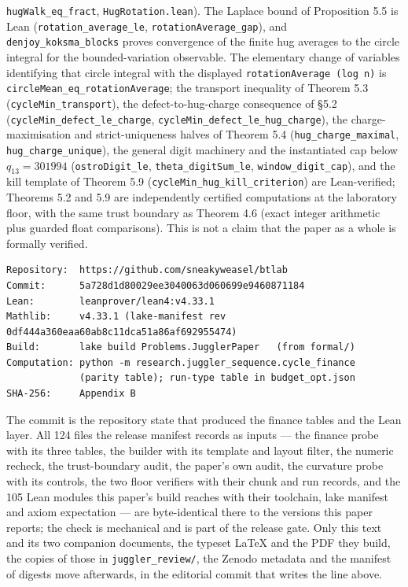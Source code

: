 \documentclass[12pt]{article}
\begin{document}
\texttt{\nolinkurl{hugWalk_eq_fract}},
\texttt{\nolinkurl{HugRotation.lean}}). The Laplace bound of Proposition
5.5 is Lean (\texttt{\nolinkurl{rotation_average_le}},
\texttt{\nolinkurl{rotationAverage_gap}}), and
\texttt{\nolinkurl{denjoy_koksma_blocks}} proves convergence of the
finite hug averages to the circle integral for the bounded-variation
observable. The elementary change of variables identifying that circle
integral with the displayed
\texttt{rotationAverage\ (log\ n\textquotesingle{})} is
\texttt{\nolinkurl{circleMean_eq_rotationAverage}}; the transport
inequality of Theorem 5.3 (\texttt{\nolinkurl{cycleMin_transport}}), the
defect-to-hug-charge consequence of §5.2
(\texttt{\nolinkurl{cycleMin_defect_le_charge}},
\texttt{\nolinkurl{cycleMin_defect_le_hug_charge}}), the
charge-maximisation and strict-uniqueness halves of Theorem 5.4
(\texttt{\nolinkurl{hug_charge_maximal}},
\texttt{\nolinkurl{hug_charge_unique}}), the general digit machinery and
the instantiated cap below \(q_{13}=301994\)
(\texttt{\nolinkurl{ostroDigit_le}},
\texttt{\nolinkurl{theta_digitSum_le}},
\texttt{\nolinkurl{window_digit_cap}}), and the kill template of Theorem
5.9 (\texttt{\nolinkurl{cycleMin_hug_kill_criterion}}) are
Lean-verified; Theorems 5.2 and 5.9 are independently certified
computations at the laboratory floor, with the same trust boundary as
Theorem 4.6 (exact integer arithmetic plus guarded float comparisons).
This is not a claim that the paper as a whole is formally verified.

\begin{verbatim}
Repository:  https://github.com/sneakyweasel/btlab
Commit:      5a728d1d80029ee3040063d060699e9460871184
Lean:        leanprover/lean4:v4.33.1
Mathlib:     v4.33.1 (lake-manifest rev 0df444a360eaa60ab8c11dca51a86af692955474)
Build:       lake build Problems.JugglerPaper   (from formal/)
Computation: python -m research.juggler_sequence.cycle_finance
             (parity table); run-type table in budget_opt.json
SHA-256:     Appendix B
\end{verbatim}

The commit is the repository state that produced the finance tables and
the Lean layer. All 124 files the release manifest records as inputs ---
the finance probe with its three tables, the builder with its template
and layout filter, the numeric recheck, the trust-boundary audit, the
paper's own audit, the curvature probe with its controls, the two floor
verifiers with their chunk and run records, and the 105 Lean modules
this paper's build reaches with their toolchain, lake manifest and axiom
expectation --- are byte-identical there to the versions this paper
reports; the check is mechanical and is part of the release gate. Only
this text and its two companion documents, the typeset LaTeX and the PDF
they build, the copies of those in \texttt{\nolinkurl{juggler_review/}},
the Zenodo metadata and the manifest of digests move afterwards, in the
editorial commit that writes the line above.
\end{document}
